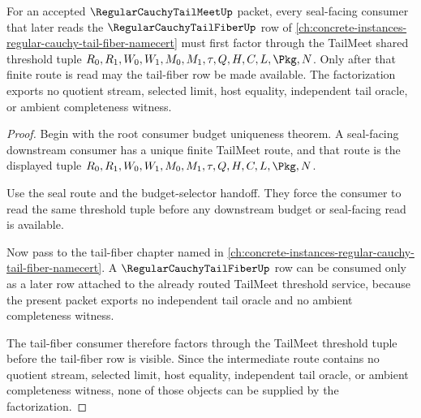 \begin{theorem}
\label{thm:regular-cauchy-tail-meet-seal-consumer-tail-fiber-factorization}
For an accepted $\RegularCauchyTailMeetUp$ packet, every seal-facing consumer
that later reads the $\RegularCauchyTailFiberUp$ row of
\autoref{ch:concrete-instances-regular-cauchy-tail-fiber-namecert} must first
factor through the TailMeet shared threshold tuple
$R_0,R_1,W_0,W_1,M_0,M_1,\tau,Q,H,C,L,\Pkg,N$. Only after that finite route is
read may the tail-fiber row be made available. The factorization exports no
quotient stream, selected limit, host equality, independent tail oracle, or
ambient completeness witness.
\end{theorem}
\begin{proof}
Begin with the root consumer budget uniqueness theorem. A seal-facing downstream
consumer has a unique finite TailMeet route, and that route is the displayed
tuple $R_0,R_1,W_0,W_1,M_0,M_1,\tau,Q,H,C,L,\Pkg,N$.

Use the seal route and the budget-selector handoff. They force the consumer to
read the same threshold tuple before any downstream budget or seal-facing read
is available.

Now pass to the tail-fiber chapter named in
\autoref{ch:concrete-instances-regular-cauchy-tail-fiber-namecert}. A
$\RegularCauchyTailFiberUp$ row can be consumed only as a later row attached to
the already routed TailMeet threshold service, because the present packet
exports no independent tail oracle and no ambient completeness witness.

The tail-fiber consumer therefore factors through the TailMeet threshold tuple
before the tail-fiber row is visible. Since the intermediate route contains no
quotient stream, selected limit, host equality, independent tail oracle, or
ambient completeness witness, none of those objects can be supplied by the
factorization.
\end{proof}

